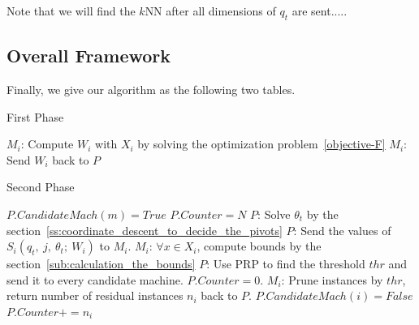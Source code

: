 Note that we will find the $k$NN after all dimensions of $q_t$ are sent.....




\subsection{Overall Framework} %
\label{ss:overall_framework}

Finally, we give our algorithm as the following two tables.

\begin{algorithm}
  \caption{First Phase}
  {
  	$M_i$: Compute $W_i$ with $X_i$ by solving the optimization problem~\eqref{objective-F}\;
  	$M_i$: Send $W_i$ back to $P$\;
  }
\end{algorithm}


\begin{algorithm}
  \caption{Second Phase}
  $P.CandidateMach(m)= True$\;
  $P.Counter=N$\;
  $P$: Solve $\theta_t$ by the section~\ref{ss:coordinate_descent_to_decide_the_pivots}\;
  {
	  {
	  	{
	  		$P$: Send the values of $S_i(q_t,~j,~\theta_t;~W_i)$ to $M_i$.\;
		  	$M_i$: $\forall x\in X_i$, compute bounds by the section~\ref{sub:calculation_the_bounds}\;
	  	}
	  }
	  $P$: Use PRP to find the threshold $thr$ and send it to every candidate machine.\;
	  $P.Counter = 0$.\;
	  {
	  	{
		  	$M_i$: Prune instances by $thr$, return number of residual instances $n_i$ back to $P$.\;
			{
				$P.CandidateMach(i) = False$\;
			}
			$P.Counter += n_i$\;
	  	}
	  }
   }
\end{algorithm}




%
